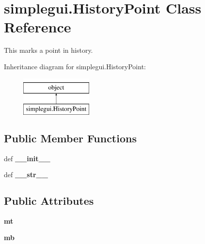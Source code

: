 \hypertarget{classsimplegui_1_1_history_point}{\section{simplegui.\-History\-Point Class Reference}
\label{classsimplegui_1_1_history_point}
}


This marks a point in history.  


Inheritance diagram for simplegui.\-History\-Point\-:\begin{figure}[H]
\begin{center}
\leavevmode
\includegraphics[height=2.000000cm]{classsimplegui_1_1_history_point}
\end{center}
\end{figure}
\subsection*{Public Member Functions}
\begin{DoxyCompactItemize}
\item 
\hypertarget{classsimplegui_1_1_history_point_adef3ead0b78d571c80b2af41a518f6c9}{def {\bfseries \-\_\-\-\_\-init\-\_\-\-\_\-}}\label{classsimplegui_1_1_history_point_adef3ead0b78d571c80b2af41a518f6c9}

\item 
\hypertarget{classsimplegui_1_1_history_point_abcec6fb63958f3afe1d5d6a389f87da2}{def {\bfseries \-\_\-\-\_\-str\-\_\-\-\_\-}}\label{classsimplegui_1_1_history_point_abcec6fb63958f3afe1d5d6a389f87da2}

\end{DoxyCompactItemize}
\subsection*{Public Attributes}
\begin{DoxyCompactItemize}
\item 
\hypertarget{classsimplegui_1_1_history_point_a0f5b051672c1140339c311a58476e912}{{\bfseries mt}}\label{classsimplegui_1_1_history_point_a0f5b051672c1140339c311a58476e912}

\item 
\hypertarget{classsimplegui_1_1_history_point_add6d6ab7f5a88db24d7ee292fa45bf86}{{\bfseries mb}}\label{classsimplegui_1_1_history_point_add6d6ab7f5a88db24d7ee292fa45bf86}

\end{DoxyCompactItemize}


